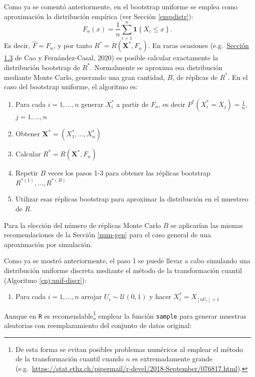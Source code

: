\documentclass[
  spanish,
  10pt,
]{book}
\providecommand{\tightlist}{%
  \setlength{\itemsep}{0pt}\setlength{\parskip}{0pt}}
\renewcommand{\mathbf}[1]{\symbf{#1}}
\theoremstyle{break}
\theoremstyle{nonumberplain}
\let\oldfootnote\footnote
\renewcommand\footnote[1]{\oldfootnote{\hspace{2mm}#1}}
\begin{document}
Como ya se comentó anteriormente, en el bootstrap uniforme se emplea como aproximación la distribución empírica (ver Sección \ref{empdistr}):
\[F_n\left( x \right) =\frac{1}{n}\sum_{i=1}^{n}\mathbf{1}\left\{ X_i\leq x\right\}.\]
Es decir, \(\hat{F}=F_n\), y por tanto \(R^{\ast}=R\left( \mathbf{X}^{\ast},F_n \right)\).
En raras ocasiones (e.g.~\href{https://rubenfcasal.github.io/book_remuestreo/c\%C3\%A1lculo-de-la-distribuci\%C3\%B3n-bootstrap-exacta-y-aproximada.html}{Sección 1.3} de Cao y Fernández-Casal, 2020) es posible calcular exactamente la distribución bootstrap de \(R^{\ast}\).
Normalmente se aproxima esa distribución mediante Monte Carlo, generando una gran cantidad, \(B\), de réplicas de \(R^{\ast}\).
En el caso del bootstrap uniforme, el algoritmo es:

\begin{enumerate}
\def\labelenumi{\arabic{enumi}.}
\item
  Para cada \(i=1,\ldots ,n\) generar \(X_i^{\ast}\) a partir de \(F_n\), es decir
  \(P^{\ast}\left( X_i^{\ast}=X_j \right) =\frac{1}{n}\), \(j=1,\ldots,n\)
\item
  Obtener \(\mathbf{X}^{\ast}=\left( X_1^{\ast},\ldots
  ,X_n^{\ast} \right)\)
\item
  Calcular \(R^{\ast}=R\left( \mathbf{X}^{\ast},F_n \right)\)
\item
  Repetir \(B\) veces los pasos 1-3 para obtener las réplicas bootstrap
  \(R^{\ast (1)}, \ldots, R^{\ast (B)}\)
\item
  Utilizar esas réplicas bootstrap para aproximar la distribución en el
  muestreo de \(R\).
\end{enumerate}

Para la elección del número de réplicas Monte Carlo \(B\) se aplicarían las mismas recomendaciones de la Sección \ref{num-gen} para el caso general de una aproximación por simulación.

Como ya se mostró anteriormente, el paso 1 se puede llevar a cabo simulando una distribución uniforme discreta mediante el método de la transformación cuantil (Algoritmo \ref{cnj:unif-discr}):

\begin{enumerate}
\def\labelenumi{\arabic{enumi}.}
\tightlist
\item
  Para cada \(i=1,\ldots ,n\) arrojar \(U_i\sim \mathcal{U}\left( 0,1 \right)\) y
  hacer \(X_i^{\ast}=X_{\left\lfloor nU_i\right\rfloor +1}\)
\end{enumerate}

Aunque en \texttt{R} es recomendable\footnote{De esta forma se evitan posibles problemas numéricos al emplear el método de la transformación cuantil cuando \(n\) es extremadamente grande (e.g.~\url{https://stat.ethz.ch/pipermail/r-devel/2018-September/076817.html}).} emplear la función \texttt{sample} para generar muestras aleatorias con reemplazamiento del conjunto de datos original:
\end{document}
